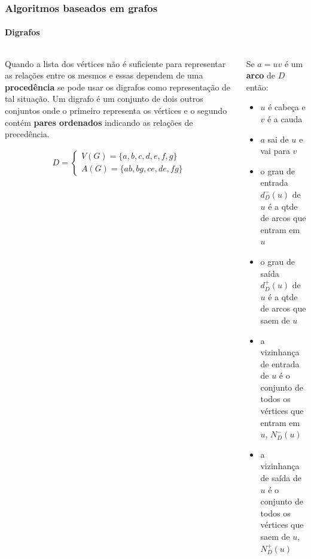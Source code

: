 \begin{frame}
	\frametitle{Algoritmos baseados em grafos}
	\framesubtitle{Digrafos}
	\begin{columns}
	\begin{column}{0.5\textwidth}
		\par Quando a lista dos vértices não é suficiente para representar  as relações entre os mesmos e essas dependem de uma \textbf{procedência} se pode usar os digrafos como representação de tal situação. Um digrafo é um conjunto de dois outros conjuntos onde o primeiro representa os vértices e o segundo contém \textbf{pares ordenados} indicando as relações de precedência.
		
		\begin{equation}
			\begin{aligned}	
				D=	
				\begin{cases}
					V(G) = \{a,b,c,d,e,f,g\} \\
					A(G) = \{ab,bg,ce,de,fg\}
				\end{cases}
			\end{aligned}
		\end{equation}

	\end{column}
	\begin{column}{0.5\textwidth}
			\par Se $ a = uv $ é um \textbf{arco} de $D$ então:
			\begin{itemize}
				\item $u$ é cabeça e $v$ é a cauda
				\item $a$ sai de $u$ e vai para $v$
				\item o grau de entrada $d^-_D(u)$ de $u$ é a qtde de arcos que entram em $u$
				\item o grau de saída $d^+_D(u)$ de $u$ é a qtde de arcos que saem de $u$
				\item a vizinhança de entrada de $u$ é o conjunto de todos os vértices que entram em $u$, $N^-_D(u)$
				\item a vizinhança de saída de $u$ é o conjunto de todos os vértices que saem de $u$, $N^+_D(u)$
			\end{itemize}
		\end{column}
	\end{columns}
\end{frame}

